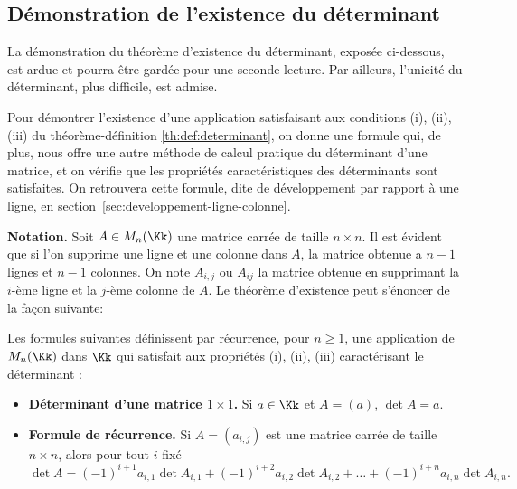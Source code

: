 \documentclass[class=report,crop=false]{standalone}
\begin{document}
\subsection{Démonstration de l'existence du déterminant} \label{sec:preuve-existence}

La démonstration du théorème d'existence du déterminant, exposée ci-dessous, est ardue et pourra
être gardée pour une seconde lecture. Par ailleurs, l'unicité du déterminant, plus difficile, est admise.

Pour démontrer l'existence d'une application satisfaisant aux
conditions (i), (ii), (iii) du théorème-définition \ref{th:def:determinant},
on donne une formule qui, de plus, nous offre une autre méthode de calcul pratique
du déterminant d'une matrice, et on vérifie que les propriétés caractéristiques des déterminants
sont satisfaites. On retrouvera cette formule, dite de développement par rapport à une ligne,
en section~\ref{sec:developpement-ligne-colonne}.

\textbf{Notation.}
Soit $A \in M_n(\Kk)$ une matrice carrée de taille $n \times n$.
Il est évident que si l'on supprime une ligne et une colonne dans $A$,
la matrice obtenue a $n-1$ lignes et $n-1$ colonnes.
On note $A_{i,j}$ ou $A_{ij}$ la matrice obtenue en supprimant la $i$-ème ligne et la $j$-ème
colonne de $A$. Le théorème d'existence peut s'énoncer de la façon suivante:

\begin{theoreme}
Les formules suivantes définissent par récurrence, pour $n\ge 1$,
une application de $M_n(\Kk)$ dans $\Kk$ qui satisfait aux propriétés
(i), (ii), (iii) caractérisant le déterminant :
\begin{itemize}
  \item \textbf{Déterminant d'une matrice $1\times 1$.}
  Si $a \in \Kk$ et $A=(a)$, $\det A = a$.

  \item \textbf{Formule de récurrence.}
  Si $A=(a_{i,j})$ est une matrice carrée de taille $n \times n$, alors pour tout $i$ fixé
$$\det A = (-1)^{i+1}a_{i,1}\det A_{i,1}+(-1)^{i+2}a_{i,2}\det A_{i,2} +\dots
+ (-1)^{i+n}a_{i,n}\det A_{i,n}.$$
\end{itemize}

\end{theoreme}
\end{document}
